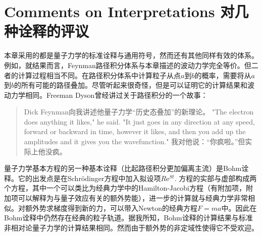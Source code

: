 \section[对几种诠释的评议]{Comments on Interpretations \quad 对几种诠释的评议}\label{sec8.7}
本章采用的都是量子力学的标准诠释与通用符号，然而还有其他同样有效的体系。例如，就结果而言，Feynman路径积分体系与本章描述的波动力学完全等价。但二者的计算过程相当不同。在路径积分体系中计算粒子从点$a$到$b$的概率，需要将从$a$到$b$的所有可能的路径叠加。尽管听起来很奇怪，但是可以证明它的计算结果和波动力学相同。Freeman Dyson曾经讲过关于路径积分的一个故事：

\begin{quote}
Dick Feynman向我讲述他量子力学“历史态叠加”的新理论。 "The electron does anything it likes," he said. "It just goes in any direction at any speed, forward or backward in time, however it likes, and then you add up the amplitudes and it gives you the wavefunction."
我对他说：“你疯啦。”但实际上他没疯。
\end{quote}

量子力学基本方程的另一种基本诠释（比起路径积分更加偏离主流）是Bohm诠释。它的出发点是在Schrödinger方程中加入拟设项$R \mathrm{e}^{St}$. 方程的实部与虚部构成两个方程，其中一个可以类比为经典力学中的Hamilton-Jacobi方程（有附加项，附加项可以解释为与量子效应有关的额外势能），进一步的计算就与经典力学非常相似。对额外势求梯度得到新的力，可以带入Newton的经典方程$F = ma$中。因此在Bohm诠释中仍然存在经典的粒子轨道。据我所知，Bohm诠释的计算结果与标准非相对论量子力学的计算结果相同。然而由于额外势的非定域性使得它不受欢迎。


